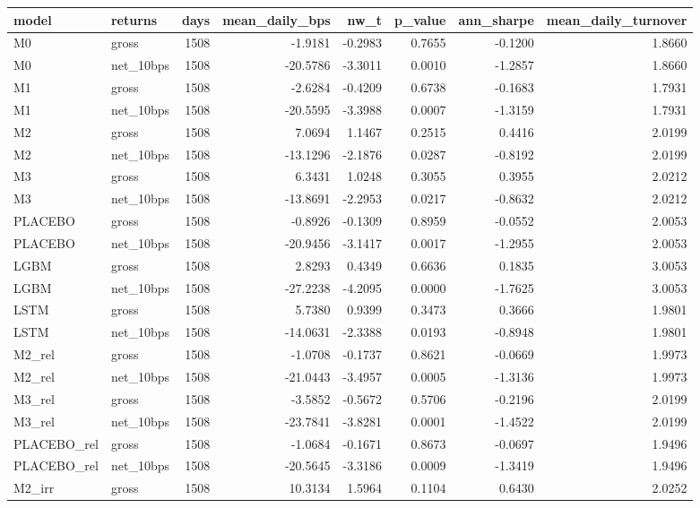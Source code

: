 \begin{tabular}{llrrrrrr}
\toprule
model & returns & days & mean\_daily\_bps & nw\_t & p\_value & ann\_sharpe & mean\_daily\_turnover \\
\midrule
M0 & gross & 1508 & -1.9181 & -0.2983 & 0.7655 & -0.1200 & 1.8660 \\
M0 & net\_10bps & 1508 & -20.5786 & -3.3011 & 0.0010 & -1.2857 & 1.8660 \\
M1 & gross & 1508 & -2.6284 & -0.4209 & 0.6738 & -0.1683 & 1.7931 \\
M1 & net\_10bps & 1508 & -20.5595 & -3.3988 & 0.0007 & -1.3159 & 1.7931 \\
M2 & gross & 1508 & 7.0694 & 1.1467 & 0.2515 & 0.4416 & 2.0199 \\
M2 & net\_10bps & 1508 & -13.1296 & -2.1876 & 0.0287 & -0.8192 & 2.0199 \\
M3 & gross & 1508 & 6.3431 & 1.0248 & 0.3055 & 0.3955 & 2.0212 \\
M3 & net\_10bps & 1508 & -13.8691 & -2.2953 & 0.0217 & -0.8632 & 2.0212 \\
PLACEBO & gross & 1508 & -0.8926 & -0.1309 & 0.8959 & -0.0552 & 2.0053 \\
PLACEBO & net\_10bps & 1508 & -20.9456 & -3.1417 & 0.0017 & -1.2955 & 2.0053 \\
LGBM & gross & 1508 & 2.8293 & 0.4349 & 0.6636 & 0.1835 & 3.0053 \\
LGBM & net\_10bps & 1508 & -27.2238 & -4.2095 & 0.0000 & -1.7625 & 3.0053 \\
LSTM & gross & 1508 & 5.7380 & 0.9399 & 0.3473 & 0.3666 & 1.9801 \\
LSTM & net\_10bps & 1508 & -14.0631 & -2.3388 & 0.0193 & -0.8948 & 1.9801 \\
M2\_rel & gross & 1508 & -1.0708 & -0.1737 & 0.8621 & -0.0669 & 1.9973 \\
M2\_rel & net\_10bps & 1508 & -21.0443 & -3.4957 & 0.0005 & -1.3136 & 1.9973 \\
M3\_rel & gross & 1508 & -3.5852 & -0.5672 & 0.5706 & -0.2196 & 2.0199 \\
M3\_rel & net\_10bps & 1508 & -23.7841 & -3.8281 & 0.0001 & -1.4522 & 2.0199 \\
PLACEBO\_rel & gross & 1508 & -1.0684 & -0.1671 & 0.8673 & -0.0697 & 1.9496 \\
PLACEBO\_rel & net\_10bps & 1508 & -20.5645 & -3.3186 & 0.0009 & -1.3419 & 1.9496 \\
M2\_irr & gross & 1508 & 10.3134 & 1.5964 & 0.1104 & 0.6430 & 2.0252 \\

\end{tabular}
